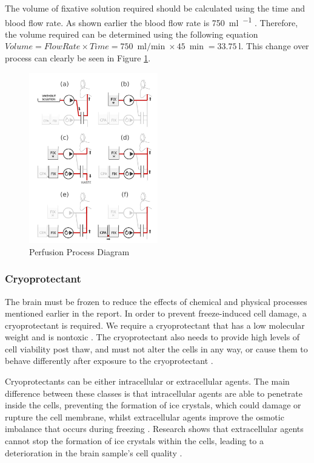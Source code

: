 \documentclass[a4paper, 11pt]{article}
\numberwithin{equation}{section}
\begin{document}
The volume of fixative solution required should be calculated using the time and blood flow rate. As shown earlier the blood flow rate is \SI{750}{\milli\litre\per\min} \cite{bloodflowrate}. Therefore, the volume required can be determined using the following equation $Volume= Flow Rate \times Time = \SI{750}{\milli\litre\per\min} \times \SI{45}{\min}= \SI{33.75}{\litre}$. This change over process can clearly be seen in Figure \ref{fig:Prefusion_figure}. 

\begin{figure}[H]
\centering
\includegraphics[width=0.50\textwidth]{bunny_perfusion_diagram.png}
\caption{\label{fig:Prefusion_figure}Perfusion Process Diagram \cite{Aldehyde_stabilized_cryopreservation}}
\end{figure}

\subsubsection{Cryoprotectant}
\label{chemical_cryoprotectant}

The brain must be frozen to reduce the effects of chemical and physical processes mentioned earlier in the report. In order to prevent freeze-induced cell damage, a cryoprotectant is required. We require a cryoprotectant that has a low molecular weight and is nontoxic \cite{cyrogenanimalcellcultures}. The cryoprotectant also needs to provide high levels of cell viability post thaw, and must not alter the cells in any way, or cause them to behave differently after exposure to the cryoprotectant \cite{Cryoprotectantsoptions}.

Cryoprotectants can be either intracellular or extracellular agents. The main difference between these classes is that intracellular agents are able to penetrate inside the cells, preventing the formation of ice crystals, which could damage or rupture the cell membrane, whilst extracellular agents improve the osmotic imbalance that occurs during freezing \cite{Cryoprotectantsoptions}. Research shows that extracellular agents cannot stop the formation of ice crystals within the cells, leading to a deterioration in the brain sample's cell quality \cite{CryopreservationFelipedeLaraJanz}.
\end{document}
